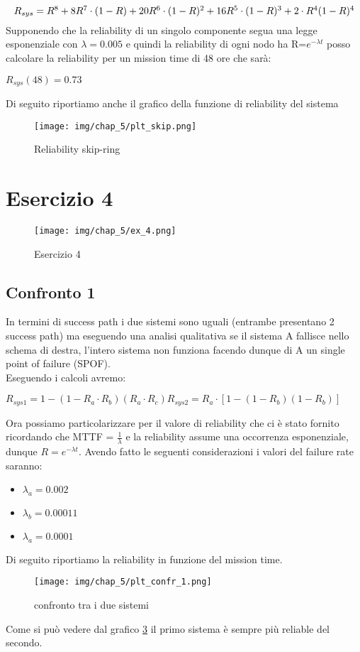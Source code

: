     \[
        \resizebox{1\textwidth}{!}{$
            R_{sys} = R^8+8R^7 \cdot (1-R)+20R^6 \cdot (1-R)^2+16R^5 \cdot (1-R)^3+2 \cdot R^4(1-R)^4
        $}
    \]
Supponendo che la reliability di un singolo componente segua una legge esponenziale con $\lambda = 0.005$ e quindi la reliability di ogni nodo ha R=$e^{- \lambda t}$ posso calcolare la reliability per un mission time di 48 ore che sarà:
\begin{center}
    $
    R_{sys}(48) = 0.73
    $
\end{center}
Di seguito riportiamo anche il grafico della funzione di reliability del sistema
\begin{figure}[H]
    \centering
    \texttt{[image: img/chap\_5/plt\_skip.png]}
    \caption{Reliability skip-ring}
    \label{fig:plt_skip}
\end{figure}

\section{Esercizio 4}
\begin{figure}[H]
    \centering
    \texttt{[image: img/chap\_5/ex\_4.png]}
    \caption{Esercizio 4}
    \label{fig:plt_skip}
\end{figure}
\subsection{Confronto 1}
In termini di success path i due sistemi sono uguali (entrambe presentano 2 success path) ma eseguendo una analisi qualitativa se il sistema A fallisce nello schema di destra, l'intero sistema non funziona facendo dunque di A un single point of failure (SPOF).\\
Eseguendo i calcoli avremo:
\begin{center}
    $
    R_{sys1} = 1-(1-R_a \cdot R_b)(R_a \cdot R_c)
    R_{sys2} = R_a \cdot [1-(1-R_b)(1-R_b)]
    $
\end{center}
Ora possiamo particolarizzare per il valore di reliability che ci è stato fornito ricordando che MTTF = $\frac{1}{\lambda}$ e la reliability assume una occorrenza esponenziale, dunque $R=e^{-\lambda t}$.
Avendo fatto le seguenti considerazioni i valori del failure rate saranno:
\begin{itemize}
    \item $\lambda_a = 0.002$
    \item $\lambda_b = 0.00011$
    \item $\lambda_a = 0.0001$
\end{itemize}
Di seguito riportiamo la reliability in funzione del mission time.\\
\begin{figure}[H]
    \centering
    \texttt{[image: img/chap\_5/plt\_confr\_1.png]}
    \caption{confronto tra i due sistemi}
    \label{fig:cofr_sys}
\end{figure}
Come si può vedere dal grafico \ref{fig:cofr_sys} il primo sistema è sempre più reliable del secondo.
